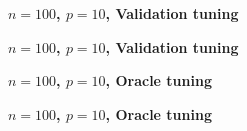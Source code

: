 \documentclass{article}
\begin{document}
\begin{figure}[p]
\centering
{\Large\bf $n=100$, $p=10$, Validation tuning} \\
\bigskip

\end{figure}

\begin{figure}[p]
\centering
{\Large\bf $n=100$, $p=10$, Validation tuning} \\
\bigskip

\end{figure}

\begin{figure}[p]
\centering
{\Large\bf $n=100$, $p=10$, Oracle tuning} \\
\bigskip

\end{figure}

\begin{figure}[p]
\centering
{\Large\bf $n=100$, $p=10$, Oracle tuning} \\
\bigskip

\end{figure}
\end{document}
